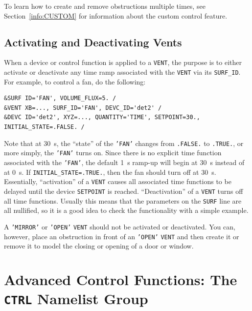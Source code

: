 \documentclass[11pt]{book}
\newcommand{\ct}{\tt\small}
\begin{document}
To learn how to create and remove obstructions multiple times, see Section~\ref{info:CUSTOM} for information about the custom control feature.



\subsection{Activating and Deactivating Vents}
\label{info:activate_deactivate}

When a device or control function is applied to a {\ct VENT}, the purpose is to either activate or deactivate any time ramp associated with
the {\ct VENT} via its {\ct SURF\_ID}. For example, to control a fan, do the following:

\footnotesize
\begin{verbatim}
&SURF ID='FAN', VOLUME_FLUX=5. /
&VENT XB=..., SURF_ID='FAN', DEVC_ID='det2' /
&DEVC ID='det2', XYZ=..., QUANTITY='TIME', SETPOINT=30., INITIAL_STATE=.FALSE. /
\end{verbatim}
\normalsize

\noindent
Note that at 30~s, the ``state'' of the {\ct 'FAN'} changes from {\ct .FALSE.} to {\ct .TRUE.}, or more simply, the {\ct 'FAN'} turns on. Since there
is no explicit time function associated with the {\ct 'FAN'}, the default 1~s ramp-up will begin at 30~s instead of at 0~s. If {\ct INITIAL\_STATE=.TRUE.}, then the fan should turn off at 30~s. Essentially, ``activation'' of a {\ct VENT} causes all associated
time functions to be delayed until the device {\ct SETPOINT} is reached. ``Deactivation'' of a {\ct VENT} turns off all time functions. Usually this means
that the parameters on the {\ct SURF} line are all nullified, so it is a good idea to check the functionality with a simple example.


\begin{warning}
A {\ct 'MIRROR'} or {\ct 'OPEN'} {\ct VENT} should not be activated or deactivated.
You can, however, place an obstruction in front of an {\ct 'OPEN'} {\ct VENT} and then create it or remove it to model the closing or opening of a door or
window.
\end{warning}



\newpage

\section{Advanced Control Functions: The \texorpdfstring{{\tt CTRL}}{CTRL} Namelist Group}
\label{info:CTRL}
\end{document}
